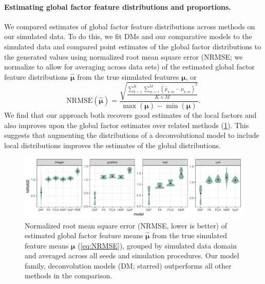\documentclass[twoside,11pt]{article}
\begin{document}
\noindent\paragraph{Estimating global factor feature distributions and proportions.}
We compared estimates of global factor feature distributions across methods on our simulated data.  To do this, we fit DMs and our comparative models to the simulated data and compared point estimates of the global factor distributions to the generated values using normalized root mean square error (NRMSE; we normalize to allow for averaging across data sets) of the estimated global factor feature distributions $\hat{\boldsymbol{\mu}}$ from the true simulated features $\boldsymbol{\mu}$, or
\begin{equation}
\mbox{NRMSE}(\hat{\boldsymbol{\mu}}) = \frac{\sqrt{\frac{\sum_{k=1}^K\sum_{m=1}^M (\hat{\mu}_{k,m} - \mu_{k,m})^2 }{K\times M}}}{\max(\boldsymbol{\mu}) - \min(\boldsymbol{\mu})}.
\label{eq:NRMSE}
\end{equation}
We find that our approach both recovers good estimates of the local factors and also improves upon the global factor estimates over related methods (\cref{fig:NRMSE_mu}). This suggests that augmenting the distributions of a deconvolutional model to include local distributions improves the estimates of the global distributions.

\begin{figure}[tbh]
\centering
\includegraphics[width=\textwidth]{NRMSE.pdf}
\caption{Normalized root mean square error (NRMSE, lower is better) of estimated global factor feature means $\hat{\boldsymbol{\mu}}$ from the true simulated feature means $\boldsymbol{\mu}$ (\cref{eq:NRMSE}), grouped by simulated data domain and averaged across all seeds and simulation procedures. Our model family, deconvolution models (DM; starred) outperforms all other methods in the comparison.
}
\label{fig:NRMSE_mu}
\end{figure}
\end{document}

